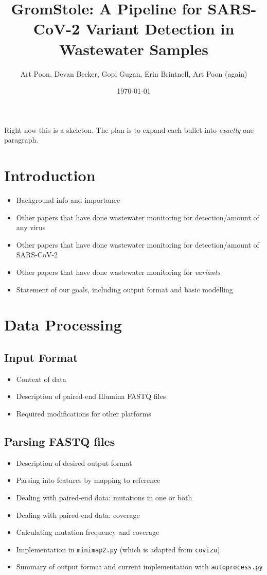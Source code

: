 \documentclass{article}
\title{GromStole: A Pipeline for SARS-CoV-2 Variant Detection in Wastewater Samples}
\author{Art Poon, Devan Becker, Gopi Gugan, Erin Brintnell, Art Poon (again)}
\date{\today}
\newenvironment{tightemize}
{ \begin{itemize}
    \setlength{\itemsep}{0pt}
    \setlength{\parskip}{0pt}
    \setlength{\parsep}{0pt}     }
{ \end{itemize}                  }
\begin{document}
\maketitle

Right now this is a skeleton. The plan is to expand each bullet into \emph{exactly} one paragraph.

\section{Introduction}

\begin{tightemize}
    \item Background info and importance
    \item Other papers that have done wastewater monitoring for detection/amount of any virus
    \item Other papers that have done wastewater monitoring for detection/amount of SARS-CoV-2
    \item Other papers that have done wastewater monitoring for \emph{variants}
    \item Statement of our goals, including output format and basic modelling
\end{tightemize}






\section{Data Processing}

\subsection{Input Format}

\begin{tightemize}
    \item Context of data
    \item Description of paired-end Illumina FASTQ files 
    \item Required modifications for other platforms
\end{tightemize}

\subsection{Parsing FASTQ files}

\begin{tightemize}
    \item Description of desired output format
    \item Parsing into features by mapping to reference
    \item Dealing with paired-end data: mutations in one or both
    \item Dealing with paired-end data: coverage
    \item Calculating mutation frequency and coverage
    \item Implementation in \texttt{minimap2.py} (which is adapted from \texttt{covizu})
    \item Summary of output format and current implementation with \texttt{autoprocess.py}
\end{tightemize}
\end{document}
